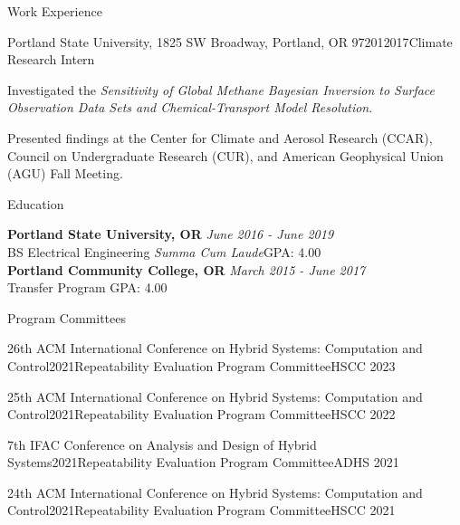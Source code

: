 \documentclass{resume}
\begin{document}
\begin{rSection}{Work Experience}
\begin{rSubsection}{Portland State University, 1825 SW Broadway, Portland, OR 97201}{2017}{Climate Research Intern}{}
\item Investigated the \textit{Sensitivity of Global Methane Bayesian Inversion to Surface Observation Data Sets and Chemical-Transport Model Resolution}.
\item Presented findings at the Center for Climate and Aerosol Research (CCAR), Council on Undergraduate Research (CUR), and American Geophysical Union (AGU) Fall Meeting.
\end{rSubsection}

\end{rSection}

\begin{rSection}{Education}

{\bf Portland State University, OR} \hfill {\em June 2016 - June 2019} 
\\ BS Electrical Engineering \quad \textit{Summa Cum Laude}\hfill {GPA: 4.00}
\\{\bf Portland Community College, OR} \hfill {\em March 2015 - June 2017} 
\\ Transfer Program \hfill {GPA: 4.00}

\end{rSection}

\begin{rSection}{Program Committees}

\begin{rSubsectionEmpty}{26th ACM International Conference on Hybrid Systems: Computation and Control}{2021}{Repeatability Evaluation Program Committee}{HSCC 2023}
\end{rSubsectionEmpty}

\begin{rSubsectionEmpty}{25th ACM International Conference on Hybrid Systems: Computation and Control}{2021}{Repeatability Evaluation Program Committee}{HSCC 2022}
\end{rSubsectionEmpty}

\begin{rSubsectionEmpty}{7th IFAC Conference on Analysis and Design of Hybrid Systems}{2021}{Repeatability Evaluation Program Committee}{ADHS 2021}
\end{rSubsectionEmpty}

\begin{rSubsectionEmpty}{24th ACM International Conference on Hybrid Systems: Computation and Control}{2021}{Repeatability Evaluation Program Committee}{HSCC 2021}
\end{rSubsectionEmpty}

\end{rSection}
\end{document}
